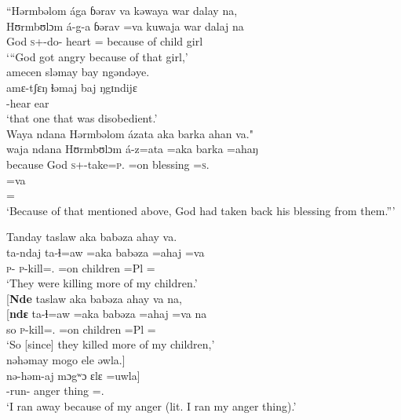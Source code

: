 \medskip  
“Hərmbəlom  ága  ɓərav  va  kəwaya  war  dalay  na,\\    
\gll Hʊrmbʊlɔm á-g-a ɓərav =va kuwaja war dalaj na\\
     God \textsc{s}+{\IFV}-do-{\CL} heart ={\PRF} {because of}  child girl {\PSP}\\ 
\glt ‘“God got angry because of that girl,’\\

\medskip
\largerpage
amecen  sləmay  bay  ngəndəye.\\
\gll amɛ-tʃɛŋ ɬəmaj baj ŋgɪndijɛ \\ 
     {\DEP}-hear ear {\NEG} {\DEM}\\ 
\glt ‘that one that was disobedient.’\\

\medskip
Waya  ndana  Hərmbəlom  ázata  aka  barka  ahan  va."\\
\gll waja ndana Hʊrmbʊlɔm á-z=ata =aka barka =ahaŋ\\ 
     because {\DEM} God \textsc{s}+{\IFV}-take=\textsc{p}.{\IO} =on blessing  =\textsc{s}.{\POSS}\\  
     
     \medskip
\gll =va\\
     ={\PRF}\\
\glt  ‘Because of that mentioned above, God had taken back his blessing from them.”’
\z 

\ea \label{ex:12:59}
Tanday  taslaw  aka  babəza  ahay  va.\\   
\gll  ta-ndaj ta-ɬ=aw =aka babəza =ahaj =va \\  
      \textsc{p}-{\PROG}  \textsc{p}-kill={\oneS}.{\IO} =on  children  =Pl  ={\PRF}\\   
\glt ‘They were killing more of my children.’\\

\medskip
{}[\textbf{Nde} taslaw  aka  babəza  ahay  va  na,\\ 
\gll {}[\textbf{ndɛ}  ta-ɬ=aw =aka babəza =ahaj =va na\\
     so    \textsc{p}-kill={\oneS}.{\IO}  =on  children  =Pl  ={\PRF}  {\PSP}\\
\glt ‘So [since] they killed more of my children,’\\

\medskip
nəhəmay  mogo  ele  əwla.]\\
\gll nə-həm-aj mɔgʷɔ ɛlɛ =uwla]\\
     {\oneS}-run-{\CL}  anger thing  ={\oneS}.{\POSS}\\
\glt  ‘I ran away because of my anger (lit. I ran my anger thing).’ 
\z 

